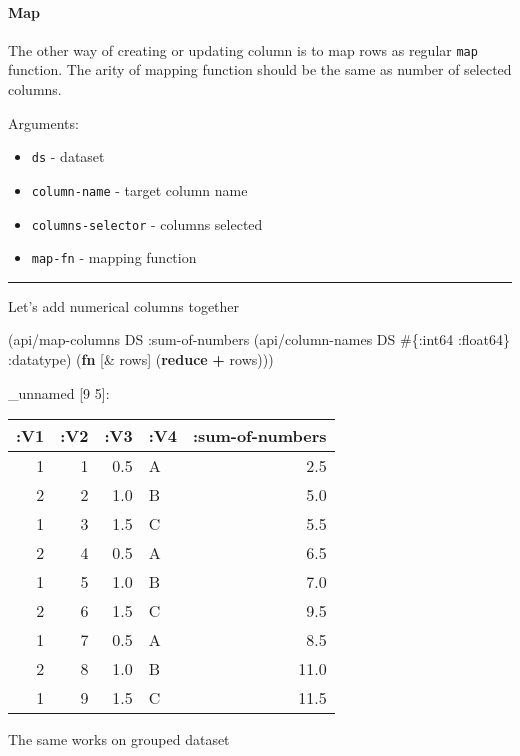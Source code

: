 \documentclass[]{article}
\newenvironment{Shaded}{\begin{snugshade}}{\end{snugshade}}
\newcommand{\KeywordTok}[1]{\textcolor[rgb]{0.13,0.29,0.53}{\textbf{#1}}}
\newcommand{\AttributeTok}[1]{\textcolor[rgb]{0.77,0.63,0.00}{#1}}
\newcommand{\NormalTok}[1]{#1}
\providecommand{\tightlist}{%
  \setlength{\itemsep}{0pt}\setlength{\parskip}{0pt}}
\let\oldparagraph\paragraph
\renewcommand{\paragraph}[1]{\oldparagraph{#1}\mbox{}}
\begin{document}
\paragraph{Map}\label{map}

The other way of creating or updating column is to map rows as regular
\texttt{map} function. The arity of mapping function should be the same
as number of selected columns.

Arguments:

\begin{itemize}
\tightlist
\item
  \texttt{ds} - dataset
\item
  \texttt{column-name} - target column name
\item
  \texttt{columns-selector} - columns selected
\item
  \texttt{map-fn} - mapping function
\end{itemize}

\begin{center}\rule{0.5\linewidth}{0.5pt}\end{center}

Let's add numerical columns together

\begin{Shaded}
\begin{Highlighting}[]
\NormalTok{(api/map-columns DS}
                 \AttributeTok{:sum-of-numbers}
\NormalTok{                 (api/column-names DS  #\{}\AttributeTok{:int64} \AttributeTok{:float64}\NormalTok{\} }\AttributeTok{:datatype}\NormalTok{)}
\NormalTok{                 (}\KeywordTok{fn}\NormalTok{ [& rows]}
\NormalTok{                   (}\KeywordTok{reduce} \KeywordTok{+}\NormalTok{ rows)))}
\end{Highlighting}
\end{Shaded}

\_unnamed {[}9 5{]}:

\begin{longtable}[]{@{}rrrlr@{}}
\toprule
:V1 & :V2 & :V3 & :V4 & :sum-of-numbers\tabularnewline
\midrule
\endhead
1 & 1 & 0.5 & A & 2.5\tabularnewline
2 & 2 & 1.0 & B & 5.0\tabularnewline
1 & 3 & 1.5 & C & 5.5\tabularnewline
2 & 4 & 0.5 & A & 6.5\tabularnewline
1 & 5 & 1.0 & B & 7.0\tabularnewline
2 & 6 & 1.5 & C & 9.5\tabularnewline
1 & 7 & 0.5 & A & 8.5\tabularnewline
2 & 8 & 1.0 & B & 11.0\tabularnewline
1 & 9 & 1.5 & C & 11.5\tabularnewline
\bottomrule
\end{longtable}

The same works on grouped dataset
\end{document}
